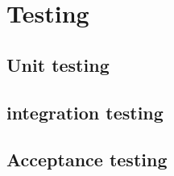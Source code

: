 \chapter{Testing}

\section{Unit testing}

\section{integration testing}


\section{Acceptance testing}



